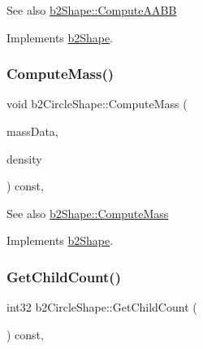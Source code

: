 \begin{DoxySeeAlso}{See also}
\mbox{\hyperlink{classb2Shape_a88e9807fab0c8ca9a98d8926e50a1411}{b2\+Shape\+::\+Compute\+A\+A\+BB}} 
\end{DoxySeeAlso}


Implements \mbox{\hyperlink{classb2Shape_a88e9807fab0c8ca9a98d8926e50a1411}{b2\+Shape}}.

\mbox{\label{classb2CircleShape_a7dc07891abd015863fbf03076e47eec5}} 
\subsubsection{\texorpdfstring{Compute\+Mass()}{ComputeMass()}}
{\footnotesize\ttfamily void b2\+Circle\+Shape\+::\+Compute\+Mass (\begin{DoxyParamCaption}\item[{\mbox{\hyperlink{structb2MassData}{b2\+Mass\+Data}} $\ast$}]{mass\+Data,  }\item[{float32}]{density }\end{DoxyParamCaption}) const\hspace{0.3cm}{\ttfamily [override]}, {\ttfamily [virtual]}}

\begin{DoxySeeAlso}{See also}
\mbox{\hyperlink{classb2Shape_a61b365526241b47f124789b0309cac69}{b2\+Shape\+::\+Compute\+Mass}} 
\end{DoxySeeAlso}


Implements \mbox{\hyperlink{classb2Shape_a61b365526241b47f124789b0309cac69}{b2\+Shape}}.

\mbox{\label{classb2CircleShape_a552db3402aed5d12c3177981e5208065}} 
\subsubsection{\texorpdfstring{Get\+Child\+Count()}{GetChildCount()}}
{\footnotesize\ttfamily int32 b2\+Circle\+Shape\+::\+Get\+Child\+Count (\begin{DoxyParamCaption}{ }\end{DoxyParamCaption}) const\hspace{0.3cm}{\ttfamily [override]}, {\ttfamily [virtual]}}

